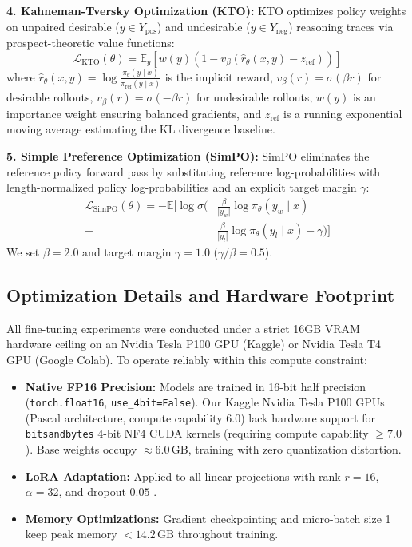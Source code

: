 \documentclass[11pt]{article}
\begin{document}
\textbf{4. Kahneman-Tversky Optimization (KTO):} KTO \citep{ethayarajh2024kto} optimizes policy weights on unpaired desirable ($y \in Y_{\text{pos}}$) and undesirable ($y \in Y_{\text{neg}}$) reasoning traces via prospect-theoretic value functions:
\begin{equation}
    \mathcal{L}_{\text{KTO}}(\theta) = \mathbb{E}_{y} \left[ w(y) \left( 1 - v_\beta \left( \hat{r}_\theta(x, y) - z_{\text{ref}} \right) \right) \right]
    \label{eq:kto_loss}
\end{equation}
where $\hat{r}_\theta(x, y) = \log \frac{\pi_\theta(y \mid x)}{\pi_{\text{ref}}(y \mid x)}$ is the implicit reward, $v_\beta(r) = \sigma(\beta r)$ for desirable rollouts, $v_\beta(r) = \sigma(-\beta r)$ for undesirable rollouts, $w(y)$ is an importance weight ensuring balanced gradients, and $z_{\text{ref}}$ is a running exponential moving average estimating the KL divergence baseline.

\textbf{5. Simple Preference Optimization (SimPO):} SimPO \citep{meng2024simpo} eliminates the reference policy forward pass by substituting reference log-probabilities with length-normalized policy log-probabilities and an explicit target margin $\gamma$:
\begin{align}
    \mathcal{L}_{\text{SimPO}}(\theta) = -\mathbb{E} \Big[ \log \sigma \Big( & \tfrac{\beta}{|y_w|} \log \pi_\theta(y_w \mid x) \nonumber \\
    {} - & \tfrac{\beta}{|y_l|} \log \pi_\theta(y_l \mid x) - \gamma \Big) \Big]
    \label{eq:simpo_loss}
\end{align}
We set $\beta = 2.0$ and target margin $\gamma = 1.0$ ($\gamma/\beta = 0.5$).

\subsection{Optimization Details and Hardware Footprint}
\label{subsec:appendix_hardware}

All fine-tuning experiments were conducted under a strict 16GB VRAM hardware ceiling on an Nvidia Tesla P100 GPU (Kaggle) or Nvidia Tesla T4 GPU (Google Colab). To operate reliably within this compute constraint:
\begin{itemize}[noitemsep,topsep=1pt]
    \item \textbf{Native FP16 Precision:} Models are trained in 16-bit half precision (\texttt{torch.float16}, \texttt{use\_4bit=False}). Our Kaggle Nvidia Tesla P100 GPUs (Pascal architecture, compute capability 6.0) lack hardware support for \texttt{bitsandbytes} 4-bit NF4 CUDA kernels (requiring compute capability $\ge 7.0$). Base weights occupy $\approx 6.0$\,GB, training with zero quantization distortion.
    \item \textbf{LoRA Adaptation:} Applied to all linear projections with rank $r = 16$, $\alpha = 32$, and dropout $0.05$ \citep{hu2021lora}.
    \item \textbf{Memory Optimizations:} Gradient checkpointing and micro-batch size 1 keep peak memory $<14.2$\,GB throughout training.
\end{itemize}
\end{document}
